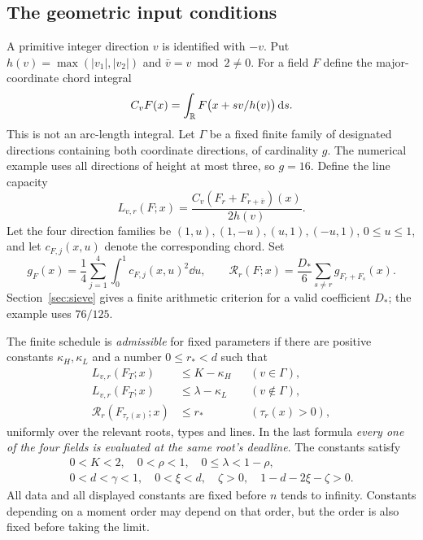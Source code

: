 \subsection{The geometric input conditions}
A primitive integer direction \(v\) is identified with \(-v\). Put
\(h(v)=\max(|v_1|,|v_2|)\) and \(\bar v=v\bmod2\ne0\).
For a field \(F\) define the major-coordinate chord integral
\[
 C_vF(x)=\int_{\mathbb R}F\bigl(x+s v/h(v)\bigr)\,\mathrm d s.
\]
This is not an arc-length integral. Let \(\Gamma\) be a fixed finite
family of designated directions containing both coordinate directions,
of cardinality \(g\).
The numerical example uses all directions of height at most three,
so \(g=16\). Define the line capacity
\begin{equation}\label{eq:capacity}
 L_{v,r}(F;x)=\frac{C_v(F_r+F_{r+\bar v})(x)}{2h(v)}.
\end{equation}
Let the four direction families be
\((1,u),(1,-u),(u,1),(-u,1)\), \(0\le u\le1\), and let
\(c_{F,j}(x,u)\) denote the corresponding chord. Set
\begin{equation}\label{eq:risk}
 g_F(x)=\frac14\sum_{j=1}^4\int_0^1c_{F,j}(x,u)^2\dd u,
 \qquad
 \mathcal R_r(F;x)=\frac{D_*}{6}\sum_{s\ne r}g_{F_r+F_s}(x).
\end{equation}
Section~\ref{sec:sieve} gives a finite arithmetic criterion for a valid
coefficient \(D_*\); the example uses \(76/125\).

The finite schedule is \emph{admissible} for fixed parameters if there
are positive constants \(\kappa_H,\kappa_L\) and a number \(0\le r_*<d\)
such that
\begin{align}
 L_{v,r}(F_T;x)&\le K-\kappa_H &&(v\in\Gamma),\label{eq:heavyinput}\\
 L_{v,r}(F_T;x)&\le\lambda-\kappa_L &&(v\notin\Gamma),\label{eq:lightinput}\\
 \mathcal R_r(F_{\tau_r(x)};x)&\le r_* &&(\tau_r(x)>0),\label{eq:riskinput}
\end{align}
uniformly over the relevant roots, types and lines. In the last formula
\emph{every one of the four fields is evaluated at the same root's
deadline}. The constants satisfy
\begin{equation}\label{eq:exponents}
 \begin{gathered}
 0<K<2,\quad 0<\rho<1,\quad 0\le\lambda<1-\rho,\\
 0<d<\gamma<1,\quad 0<\xi<d,\quad \zeta>0,\quad 1-d-2\xi-\zeta>0.
 \end{gathered}
\end{equation}
All data and all displayed constants are fixed before \(n\) tends to
infinity. Constants depending on a moment order may depend on that
order, but the order is also fixed before taking the limit.

